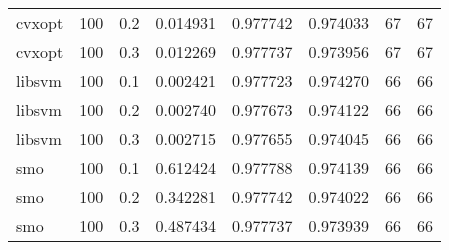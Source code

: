\begin{tabular}{lllrrrrr}
cvxopt & 100 &     0.2 &  0.014931 &  0.977742 & 0.974033 &           67 &         67 \\
cvxopt & 100 &     0.3 &  0.012269 &  0.977737 & 0.973956 &           67 &         67 \\
libsvm & 100 &     0.1 &  0.002421 &  0.977723 & 0.974270 &           66 &         66 \\
libsvm & 100 &     0.2 &  0.002740 &  0.977673 & 0.974122 &           66 &         66 \\
libsvm & 100 &     0.3 &  0.002715 &  0.977655 & 0.974045 &           66 &         66 \\
   smo & 100 &     0.1 &  0.612424 &  0.977788 & 0.974139 &           66 &         66 \\
   smo & 100 &     0.2 &  0.342281 &  0.977742 & 0.974022 &           66 &         66 \\
   smo & 100 &     0.3 &  0.487434 &  0.977737 & 0.973939 &           66 &         66 \\
\bottomrule
\end{tabular}
